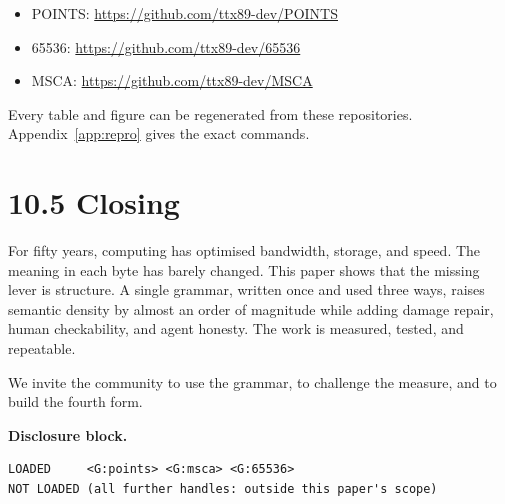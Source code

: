 \begin{itemize}
\item POINTS: \url{https://github.com/ttx89-dev/POINTS}
\item 65536: \url{https://github.com/ttx89-dev/65536}
\item MSCA: \url{https://github.com/ttx89-dev/MSCA}
\end{itemize}

Every table and figure can be regenerated from these repositories. Appendix~\ref{app:repro} gives the exact commands.

\section*{10.5 Closing}

For fifty years, computing has optimised bandwidth, storage, and speed. The meaning in each byte has barely changed. This paper shows that the missing lever is structure. A single grammar, written once and used three ways, raises semantic density by almost an order of magnitude while adding damage repair, human checkability, and agent honesty. The work is measured, tested, and repeatable.

We invite the community to use the grammar, to challenge the measure, and to build the fourth form.

\vspace{1em}
\noindent\textbf{Disclosure block.}
\begin{verbatim}
LOADED     <G:points> <G:msca> <G:65536>
NOT LOADED (all further handles: outside this paper's scope)
\end{verbatim}
